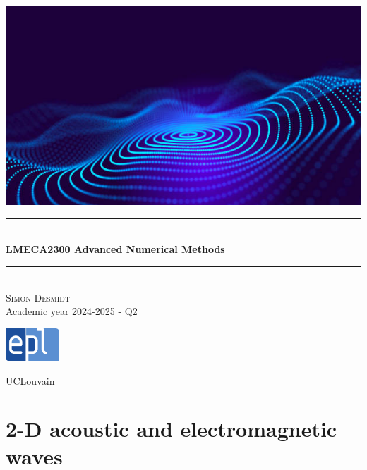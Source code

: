\documentclass[12pt, openany]{report}
\newcommand{\HRule}{\rule{\linewidth}{0.5mm}}
\theoremstyle{definition}
\begin{document}
\begin{titlepage}
    \begin{sffamily}
    \begin{center}
        \includegraphics[scale=2.5]{img/page_de_garde.png} \\[1cm]
        \HRule \\[0.4cm]
        { \huge \bfseries LMECA2300 Advanced Numerical Methods \\[0.4cm] }
    
        \HRule \\[1.5cm]
        \textsc{\LARGE Simon Desmidt}\\[1cm]
        \vfill
        \vspace{2cm}
        {\large Academic year 2024-2025 - Q2}
        \vspace{0.4cm}
         
        \includegraphics[width=0.15\textwidth]{img/epl.png}
        
        UCLouvain\\
    
    \end{center}
    \end{sffamily}
\end{titlepage}

\setcounter{tocdepth}{1}
\tableofcontents
\chapter{2-D acoustic and electromagnetic waves}
\end{document}
